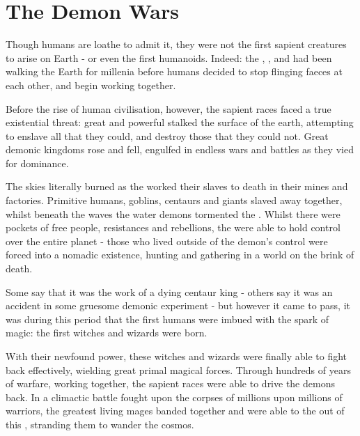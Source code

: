\documentclass[oneside, 9pt,english]{extbook}
\title{\key{True History}}
\date{5000 BC - February, 2020}
\begin{document}
	\maketitle
	
	\section{The Demon Wars}
	
	Though humans are loathe to admit it, they were not the first sapient creatures to arise on Earth - or even the first humanoids. Indeed: the , ,  and  had been walking the Earth for millenia before humans decided to stop flinging faeces at each other, and begin working together.
	
	Before the rise of human civilisation, however, the sapient races faced a true existential threat: great and powerful  stalked the surface of the earth, attempting to enslave all that they could, and destroy those that they could not. Great demonic kingdoms rose and fell, engulfed in endless wars and battles as they vied for dominance. 
	
	The skies literally burned as the  worked their slaves to death in their mines and factories. Primitive humans, goblins, centaurs and giants slaved away together, whilst beneath the waves the water demons tormented the . Whilst there were pockets of free people, resistances and rebellions, the  were able to hold control over the entire planet - those who lived outside of the demon's control were forced into a nomadic existence, hunting and gathering in a world on the brink of death.
	
	Some say that it was the work of a dying centaur king - others say it was an accident in some gruesome demonic experiment - but however it came to pass, it was during this period that the first humans were imbued with the spark of magic: the first witches and wizards were born. 
	
	
	With their newfound power, these witches and wizards were finally able to fight back effectively, wielding great primal magical forces. Through hundreds of years of warfare, working together, the sapient races were able to drive the demons back. In a climactic battle fought upon the corpses of millions upon millions of warriors, the greatest living mages banded together and were able to  the  out of this , stranding them to wander the cosmos. 
	
\end{document}
